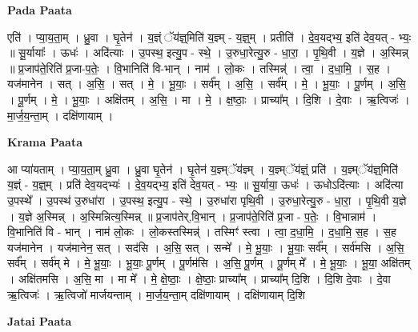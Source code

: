 \documentclass[17pt]{extarticle}
\begin{document}
\textbf{Pada Paata} \newline

एति॑ । प्या॒य॒ता॒म् । ध्रु॒वा । घृ॒तेन॑ । य॒ज्ञ्ं ॅय॑ज्ञ्॒मिति॑ य॒ज्ञ्म् - य॒ज्ञ्॒म् । प्रतीति॑ । दे॒व॒यद्भ्य॒ इति॑ देव॒यत् - भ्यः॒ ॥ सू॒र्यायाः᳚ । ऊधः॑ । अदि॑त्याः । उ॒पस्थ॒ इत्यु॒प - स्थे॒ । उ॒रुधा॒रेत्यु॒रु - धा॒रा॒ । पृ॒थि॒वी । य॒ज्ञे । अ॒स्मिन्न् ॥ प्र॒जाप॑ते॒रिति॑ प्र॒जा-प॒तेः॒ । वि॒भानिति॑ वि-भान् । नाम॑ । लो॒कः । तस्मिन्न्॑ । त्वा॒ । द॒धा॒मि॒ । स॒ह । यज॑मानेन । सत् । अ॒सि॒ । सत् । मे॒ । भू॒याः॒ । सर्व᳚म् । अ॒सि॒ । सर्व᳚म् । मे॒ । भू॒याः॒ । पू॒र्णम् । अ॒सि॒ । पू॒र्णम् । मे॒ । भू॒याः॒ । अक्षि॑तम् । अ॒सि॒ । मा । मे॒ । क्ष॒ष्ठाः॒ । प्राच्या᳚म् । दि॒शि । दे॒वाः । ऋ॒त्विजः॑ । मा॒र्ज॒य॒न्ता॒म् । दक्षि॑णायाम् ।  \newline


\textbf{Krama Paata} \newline

आ प्या॑यताम् । प्या॒य॒ता॒म् ध्रु॒वा । ध्रु॒वा घृ॒तेन॑ । घृ॒तेन॑ य॒ज्ञ्म्ॅय॑ज्ञ्म् । य॒ज्ञ्म्ॅय॑ज्ञ्ं॒ प्रति॑ । य॒ज्ञ्म्ॅय॑ज्ञ्॒मिति॑ य॒ज्ञ्ं - य॒ज्ञ्॒म् । प्रति॑ देव॒यद्भ्यः॑ । दे॒व॒यद्भ्य॒ इति॑ देव॒यत् - भ्यः॒ ॥ सू॒र्याया॒ ऊधः॑ । ऊधोऽदि॑त्याः । अदि॑त्या उ॒पस्थे᳚ । उ॒पस्थ॑ उ॒रुधा॑रा । उ॒पस्थ॒ इत्यु॒प - स्थे॒ । उ॒रुधा॑रा पृथि॒वी । उ॒रुधा॒रेत्यु॒रु - धा॒रा॒ । पृ॒थि॒वी य॒ज्ञे । य॒ज्ञे अ॒स्मिन्न् । अ॒स्मिन्नित्य॒स्मिन्न् ॥ प्र॒जाप॑तेर्,वि॒भान् । प्र॒जाप॑ते॒रिति॑ प्र॒जा - प॒तेः॒ । वि॒भान्नाम॑ । वि॒भानिति॑ वि - भान् । नाम॑ लो॒कः । लो॒कस्तस्मिन्न्॑ । तस्मिꣳ॑ स्त्वा । त्वा॒ द॒धा॒मि॒ । द॒धा॒मि॒ स॒ह । स॒ह यज॑मानेन । यज॑मानेन॒ सत् । सद॑सि । अ॒सि॒ सत् । सन्मे᳚ । मे॒ भू॒याः॒ । भू॒याः॒ सर्व᳚म् । सर्व॑मसि । अ॒सि॒ सर्व᳚म् । सर्व॑म् मे । मे॒ भू॒याः॒ । भू॒याः॒ पू॒र्णम् । पू॒र्णम॑सि । अ॒सि॒ पू॒र्णम् । पू॒र्णम् मे᳚ । मे॒ भू॒याः॒ । भू॒या॒ अक्षि॑तम् । अक्षि॑तमसि । अ॒सि॒ मा । मा मे᳚ । मे॒ क्षे॒ष्ठाः॒ । क्षे॒ष्ठाः॒ प्राच्या᳚म् । प्राच्या᳚म् दि॒शि । दि॒शि दे॒वाः । दे॒वा ऋ॒त्विजः॑ । ऋ॒त्विजो॑ मार्जयन्ताम् । मा॒र्ज॒य॒न्ता॒म् दक्षि॑णायाम् । दक्षि॑णायाम् दि॒शि \newline

\textbf{Jatai Paata} \newline
\end{document}
